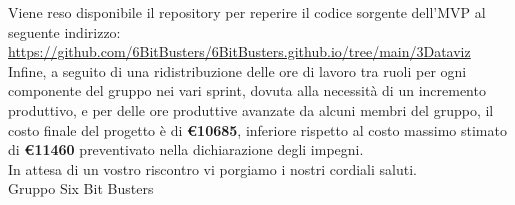         

        \noindent Viene reso disponibile il repository per reperire il codice sorgente dell'MVP al seguente indirizzo: \\
        \url{https://github.com/6BitBusters/6BitBusters.github.io/tree/main/3Dataviz}\\

        \noindent Infine, a seguito di una ridistribuzione delle ore di lavoro tra ruoli per ogni componente del gruppo nei vari sprint, dovuta alla necessità di un incremento produttivo, e per delle ore produttive avanzate da alcuni membri del gruppo, il costo finale del progetto è di \textbf{\euro 10685}, inferiore rispetto al
        costo massimo stimato di \textbf{\euro 11460} preventivato nella dichiarazione degli impegni.\\
	
	\noindent In attesa di un vostro riscontro vi porgiamo i nostri cordiali saluti.\\
        Gruppo Six Bit Busters